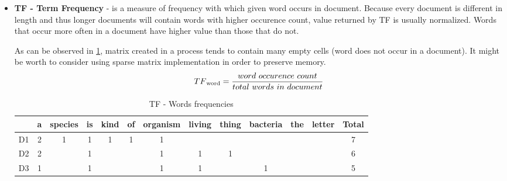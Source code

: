 \begin{itemize}
	\item \textbf{TF - Term Frequency} - is a measure of frequency with which given word occurs in document. Because every document is different in length and thus longer documents will contain words with higher occurence count, value returned by TF is usually normalized. Words that occur more often in a document have higher value than those that do not.
	
	As can be observed in \ref{tf_idf_tf_freq}, matrix created in a process tends to contain many empty cells (word does not occur in a document). It might be worth to consider using sparse matrix implementation in order to preserve memory.
	\[TF\textsubscript{word}=\frac{word\ occurence\ count}{total\ words\ in\ document}\]	
\begin{table}[H]
	\centering
	\caption{TF - Words frequencies}
	\label{tf_idf_tf_freq}
	\begin{tabular}{@{}lccccccccccc|c|@{}}
		\toprule
		& \multicolumn{1}{l}{a} & \multicolumn{1}{l}{species} & \multicolumn{1}{l}{is} & \multicolumn{1}{l}{kind} & \multicolumn{1}{l}{of} & \multicolumn{1}{l}{organism} & \multicolumn{1}{l}{living} & \multicolumn{1}{l}{thing} & \multicolumn{1}{l}{bacteria} & \multicolumn{1}{l}{the} & \multicolumn{1}{l|}{letter} & \multicolumn{1}{l|}{Total} \\ \midrule
		D1 & 2                     & 1                           & 1                      & 1                        & 1                      & 1                            &                            &                           &                              &                         &                             & 7                          \\ \cmidrule(l){13-13} 
		D2 & 2                     &                             & 1                      &                          &                        & 1                            & 1                          & 1                         &                              &                         &                             & 6                          \\ \cmidrule(l){13-13} 
		D3 & 1                     &                             & 1                      &                          &                        & 1                            & 1                          &                           & 1                            &                         &                             & 5                          \\ \cmidrule(l){13-13} 

\end{tabular}
\end{table}
\end{itemize}
